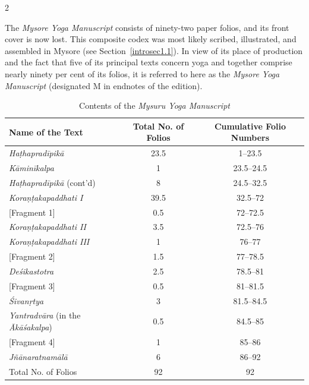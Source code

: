 \begin{nohyp}
\begin{multicols*}{2}
\begin{eng}
\label{introsec1.3}
\vskip 9pt

\noindent
The \emph{Mysore Yoga Manuscript} consists of ninety-two paper folios, and its front cover is now lost. This composite codex was most likely scribed, illustrated, and assembled in Mysore (see Section~\ref{introsec1.1}). In view of its place of production and the fact that five of its principal texts concern yoga and together comprise nearly ninety per cent of its folios, it is referred to here as the \emph{Mysore Yoga Manuscript} (designated M in endnotes of the edition).

\begin{table}[tb]
\centering
\renewcommand{\arraystretch}{1.6}
\caption{Contents of the \emph{Mysuru Yoga Manuscript}}\label{introtable1}
\vskip 6pt

\begin{tabular}{lcc}
\hline
\rowcolor{tableshade}
Name of the Text & Total No. of Folios & Cumulative Folio Numbers \\
\hline
\emph{Haṭhapradīpikā} & 23.5 & 1--23.5 \\
\emph{Kāminīkalpa} & 1 & 23.5--24.5 \\
\emph{Haṭhapradīpikā} (cont'd) & 8 & 24.5--32.5 \\
\rowcolor{tableshade}
\emph{Koraṇṭakapaddhati I} & 39.5 & 32.5--72 \\
{[}Fragment 1{]} & 0.5 & 72--72.5 \\
\rowcolor{tableshade}
\emph{Koraṇṭakapaddhati II} & 3.5 & 72.5--76 \\
\rowcolor{tableshade}
\emph{Koraṇṭakapaddhati III} & 1 & 76--77 \\
{[}Fragment 2{]} & 1.5 & 77--78.5 \\
\emph{Deśikastotra} & 2.5 & 78.5--81 \\
{[}Fragment 3{]} & 0.5 & 81--81.5 \\
\emph{Śivanṛtya} & 3 & 81.5--84.5 \\
\emph{Yantradvāra} (in the \emph{Ākāśakalpa}) & 0.5 & 84.5--85 \\
{[}Fragment 4{]} & 1 & 85--86 \\
\emph{Jñānaratnamālā} & 6 & 86--92 \\
\hline
\rowcolor{tableshade}
Total No. of Folios & 92 & 92 \\
\hline
\end{tabular}
\end{table}


\end{eng}
\end{multicols*}
\end{nohyp}
